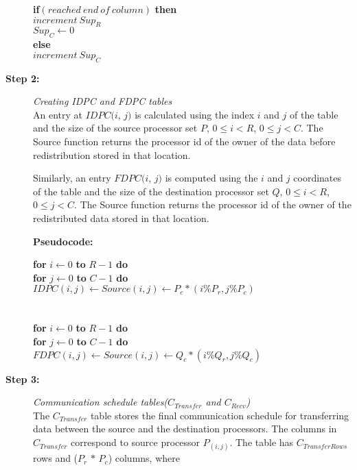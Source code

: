 \documentclass[letterpaper]{llncs}
\begin{document}
\begin{description}
\begin{tabbing}
\hspace{0.5in} \textbf{if}$(reached\ end\ of\ column)$ \textbf{then}\\
\hspace{0.7in}	$increment\ Sup_R$\\
\hspace{0.7in}	$Sup_C \leftarrow 0$\\
\hspace{0.5in}\textbf{else}\\
\hspace{0.7in}	$increment\ Sup_C$\\
\end{tabbing}
\vspace{-0.2in}
\item[\textbf{Step 2:}] \hspace{0.05in}\textit{Creating IDPC and FDPC tables}\\
An entry at $IDPC (i$, $j)$  is calculated using the index $i$ and $j$ of the table and 
the size of the source processor set $P$, $0\leq i<R$, $0\leq j<C$. 
The Source function returns the processor id of the owner of the data before redistribution stored in that location.

Similarly, an entry $FDPC (i$, $j)$  is computed using the $i$ and $j$ coordinates of the table and the size of the destination processor set $Q$, $0\leq i<R$, $0\leq j<C$. The Source function returns the processor id of the 
owner of the redistributed data stored in that location.

\textbf{Pseudocode:}
\begin{tabbing}
\hspace{0.4in}\textbf{for} $i \leftarrow 0$ \textbf{to} $R - 1$ \textbf{do}\\
\hspace{0.7in}  \textbf{for} $j \leftarrow 0$ \textbf{to} $C -1 $ \textbf{do} \\
\hspace{1in}      $IDPC(i, j) \leftarrow  Source(i,j) \leftarrow P_{c}\ast (i\% P_{r}, j\% P_{c})$ \\
\\
\\
\hspace{0.4in}\textbf{for} $i \leftarrow 0$ \textbf{to} $R - 1$ \textbf{do} \\
\hspace{0.7in}   \textbf{for} $j \leftarrow 0$ \textbf{to} $C - 1 $ \textbf{do}\\
\hspace{1in}      $FDPC(i, j) \leftarrow  Source(i,j) \leftarrow  Q_{c} \ast (i\% Q_{r}, j\% Q_{c})$
\end{tabbing}
\item[\textbf{Step 3:}] \hspace{0.05in}\textit{Communication schedule tables($C_{Transfer}$ and $C_{Recv}$)}\\
The $C_{Transfer}$ table stores the final communication schedule for transferring data between 
the source and the destination processors. The columns in $C_{Transfer}$ correspond to source processor $P_{(i,j)}$. 
The table has $C_{TransferRows}$ rows and ($P_{r}$ $\ast$ $P_{c}$) columns, where


\end{description}
\end{document}
